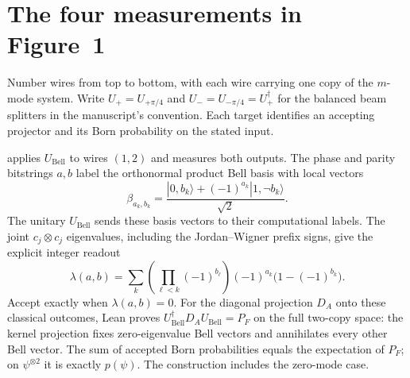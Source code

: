 \section*{The four measurements in Figure~1}

Number wires from top to bottom, with each wire carrying one copy of the
$m$-mode system. Write $U_+=U_{+\pi/4}$ and $U_-=U_{-\pi/4}=U_+^\dagger$
for the balanced beam splitters in the manuscript's convention. Each target
identifies an accepting projector and its Born probability on the stated input.

\begin{theorem}\label{target:fig1-fermions}
  \par
  \leanok
   applies $U_{\mathrm{Bell}}$ to wires $(1,2)$
  and measures both outputs. The phase and parity bitstrings $a,b$ label the
  orthonormal product Bell basis with local vectors
  \[
    \beta_{a_k,b_k}=\frac{|0,b_k\rangle+(-1)^{a_k}|1,\neg b_k\rangle}{\sqrt2}.
  \]
  The unitary $U_{\mathrm{Bell}}$ sends these basis vectors to their
  computational labels. The joint $c_j\otimes c_j$ eigenvalues, including
  the Jordan--Wigner prefix signs, give the explicit integer readout
  \[
    \lambda(a,b)=\sum_k
    \left(\prod_{\ell<k}(-1)^{b_\ell}\right)(-1)^{a_k}
    \bigl(1-(-1)^{b_k}\bigr).
  \]
  Accept exactly when $\lambda(a,b)=0$. For the diagonal projection $D_A$
  onto these classical outcomes, Lean proves
  $U_{\mathrm{Bell}}^\dagger D_A U_{\mathrm{Bell}}=P_F$ on the full
  two-copy space: the kernel projection fixes zero-eigenvalue Bell vectors
  and annihilates every other Bell vector.
  The sum of accepted Born probabilities equals the expectation of $P_F$;
  on $\psi^{\otimes2}$ it is exactly $p(\psi)$.
  The construction includes the zero-mode case.
\end{theorem}

